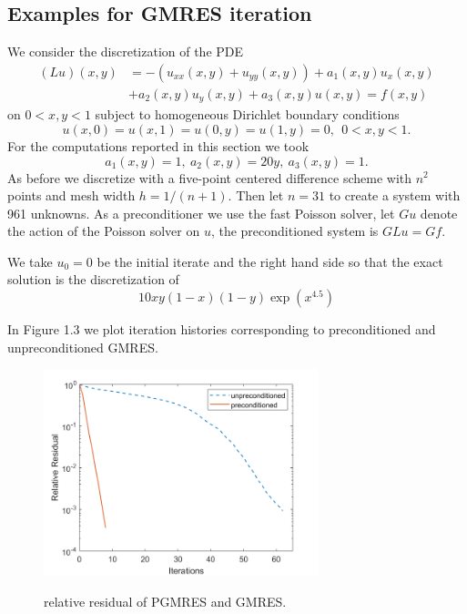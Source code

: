 \subsection{Examples for GMRES iteration}
\label{sec:3.7}

\begin{exm}
  We consider the discretization of the PDE
  \begin{equation}
    \label{eq:3.33}
    \begin{aligned}
      (Lu)(x,y)&=-(u_{xx}(x,y)+u_{yy}(x,y))+a_1(x,y)u_x(x,y)\\
      &+a_2(x,y)u_y(x,y)+a_3(x,y)u(x,y)=f(x,y)
      \end{aligned}
    \end{equation}
    on $0<x,y<1$ subject to homogeneous Dirichlet boundary conditions
    $$u(x,0)=u(x,1)=u(0,y)=u(1,y)=0,\ \ 0<x,y<1.$$
    For the computations reported in this section we took
    $$a_1(x,y)=1,\ a_2(x,y)=20y,\ a_3(x,y)=1.$$
    As before we discretize with a five-point centered difference
    scheme with $n^2$ points and mesh width $h=1/(n+1)$. Then let $n=31$ to
    create a system with 961 unknowns. As a preconditioner we use the
    fast Poisson solver, let $Gu$ denote the action of the Poisson
    solver on $u$, the preconditioned system is $GLu=Gf$.

   We take $u_0=0$ be the initial iterate and the right hand side so
   that the exact solution is the discretization of
   $$10xy(1-x)(1-y)\exp(x^{4.5})$$

   In Figure 1.3 we plot iteration histories corresponding to
   preconditioned and unpreconditioned GMRES.

    \begin{figure}[H]
    \centering\label{fig:3.7.1}
    \includegraphics[height=6cm]{3_7_1.png}
    \caption{relative residual of PGMRES and GMRES.}
  \end{figure}
\end{exm}
